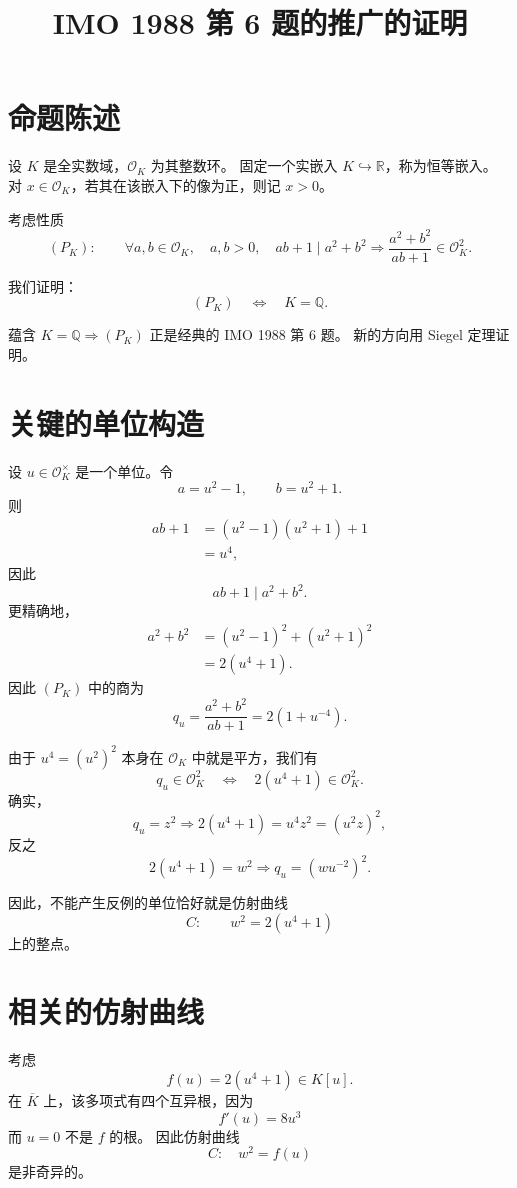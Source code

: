 \documentclass[11pt,a4paper]{article}
\title{IMO 1988 第 6 题的推广的证明}
\date{}
\newcommand{\OK}{\mathcal O_K}
\newcommand{\Q}{\mathbb Q}
\begin{document}
\maketitle

\section{命题陈述}

设 \(K\) 是全实数域，\(\OK\) 为其整数环。
固定一个实嵌入 \(K\hookrightarrow\mathbb R\)，称为恒等嵌入。
对 \(x\in\OK\)，若其在该嵌入下的像为正，则记 \(x>0\)。

考虑性质
\[
(P_K):\qquad
\forall a,b\in\OK,\quad
a,b>0,\quad ab+1\mid a^2+b^2
\Longrightarrow
\frac{a^2+b^2}{ab+1}\in \OK^2.
\]

我们证明：
\[
(P_K)\quad\Longleftrightarrow\quad K=\Q.
\]

蕴含 \(K=\Q\Rightarrow(P_K)\) 正是经典的 IMO 1988 第 6 题。
新的方向用 Siegel 定理证明。

\section{关键的单位构造}

设 \(u\in\OK^\times\) 是一个单位。令
\[
a=u^2-1,\qquad b=u^2+1.
\]
则
\begin{align*}
ab+1
&=(u^2-1)(u^2+1)+1\\
&=u^4,
\end{align*}
因此
\[
ab+1\mid a^2+b^2.
\]
更精确地，
\begin{align*}
a^2+b^2
&=(u^2-1)^2+(u^2+1)^2\\
&=2(u^4+1).
\end{align*}
因此 \((P_K)\) 中的商为
\[
q_u
=
\frac{a^2+b^2}{ab+1}
=
2(1+u^{-4}).
\]

由于 \(u^4=(u^2)^2\) 本身在 \(\OK\) 中就是平方，我们有
\[
q_u\in\OK^2
\quad\Longleftrightarrow\quad
2(u^4+1)\in\OK^2.
\]
确实，
\[
q_u=z^2
\Longrightarrow
2(u^4+1)=u^4z^2=(u^2z)^2,
\]
反之
\[
2(u^4+1)=w^2
\Longrightarrow
q_u=(wu^{-2})^2.
\]

因此，不能产生反例的单位恰好就是仿射曲线
\[
C:\qquad w^2=2(u^4+1)
\]
上的整点。

\section{相关的仿射曲线}

考虑
\[
f(u)=2(u^4+1)\in K[u].
\]
在 \(\overline K\) 上，该多项式有四个互异根，因为
\[
f'(u)=8u^3
\]
而 \(u=0\) 不是 \(f\) 的根。
因此仿射曲线
\[
C:\quad w^2=f(u)
\]
是非奇异的。
\end{document}
